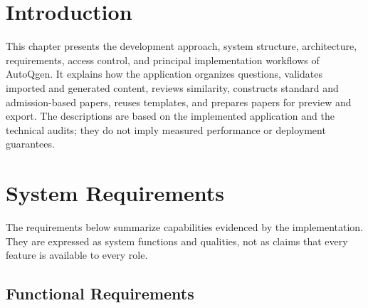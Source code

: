 
\section{Introduction}

This chapter presents the development approach, system structure, architecture, requirements, access control, and principal implementation workflows of AutoQgen. It explains how the application organizes questions, validates imported and generated content, reviews similarity, constructs standard and admission-based papers, reuses templates, and prepares papers for preview and export. The descriptions are based on the implemented application and the technical audits; they do not imply measured performance or deployment guarantees.

\section{System Requirements}

The requirements below summarize capabilities evidenced by the implementation. They are expressed as system functions and qualities, not as claims that every feature is available to every role.

\subsection{Functional Requirements}

